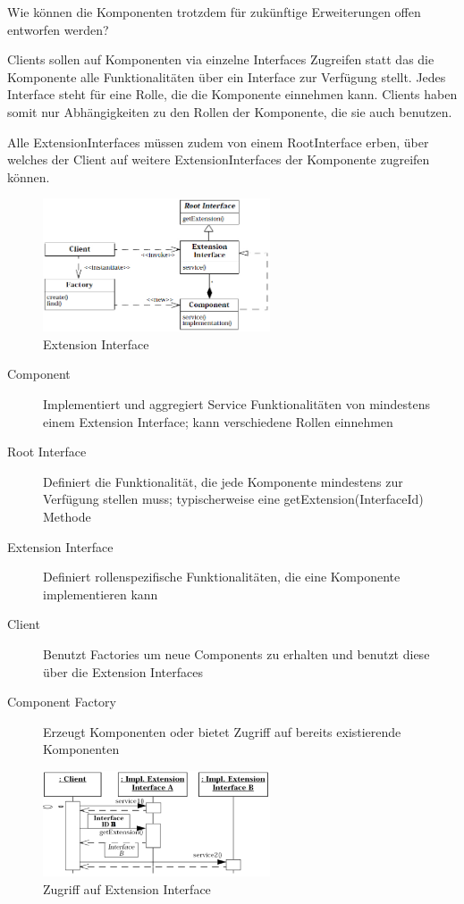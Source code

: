 Wie können die Komponenten trotzdem für zukünftige Erweiterungen offen entworfen werden?

Clients sollen auf Komponenten via einzelne Interfaces Zugreifen statt das die Komponente alle Funktionalitäten über ein Interface zur Verfügung stellt. Jedes Interface steht für eine Rolle, die die Komponente einnehmen kann. Clients haben somit nur Abhängigkeiten zu den Rollen der Komponente, die sie auch benutzen.

Alle ExtensionInterfaces müssen zudem von einem RootInterface erben, über welches der Client auf weitere ExtensionInterfaces der Komponente zugreifen können.

\begin{figure}[H]
	\centering
	\includegraphics[width=0.6\textwidth]{content/advancedPatterns/images/extensioninterface.jpg}
	\caption{Extension Interface}
\end{figure}

\begin{description}
	\item[Component] Implementiert und aggregiert Service Funktionalitäten von mindestens einem Extension Interface; kann verschiedene Rollen einnehmen
	\item[Root Interface] Definiert die Funktionalität, die jede Komponente mindestens zur Verfügung stellen muss; typischerweise eine getExtension(InterfaceId) Methode
	\item[Extension Interface] Definiert rollenspezifische Funktionalitäten, die eine Komponente implementieren kann
	\item[Client] Benutzt Factories um neue Components zu erhalten und benutzt diese über die Extension Interfaces
	\item[Component Factory] Erzeugt Komponenten oder bietet Zugriff auf bereits existierende Komponenten
\end{description}

\begin{figure}[H]
	\centering
	\includegraphics[width=0.6\textwidth]{content/advancedPatterns/images/extensioninterfaceusage.png}
	\caption{Zugriff auf Extension Interface}
\end{figure}

